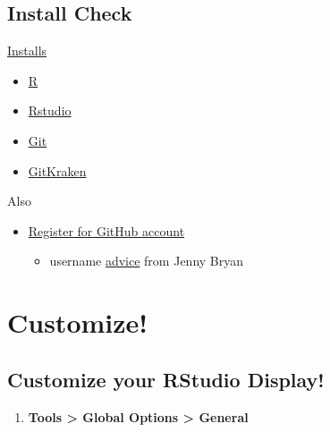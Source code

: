 \documentclass[
  letterpaper,
  DIV=11,
  numbers=noendperiod,
  oneside]{scrartcl}
\providecommand{\tightlist}{%
  \setlength{\itemsep}{0pt}\setlength{\parskip}{0pt}}\usepackage{longtable,booktabs,array}
\begin{document}
\hypertarget{install-check}{%
\subsection{Install Check}\label{install-check}}

\href{installs.qmd}{Installs}

\begin{itemize}
\tightlist
\item
  \href{https://cloud.r-project.org/}{R}
\item
  \href{https://www.rstudio.com/products/rstudio/\#Desktop}{Rstudio}
\item
  \href{https://www.git-scm.com/download}{Git}
\item
  \href{https://www.gitkraken.com/download}{GitKraken}
\end{itemize}

Also

\begin{itemize}
\tightlist
\item
  \href{https://github.com}{Register for GitHub account}

  \begin{itemize}
  \tightlist
  \item
    username \href{https://happygitwithr.com/github-acct.html}{advice}
    from Jenny Bryan
  \end{itemize}
\end{itemize}

\hypertarget{customize}{%
\section{Customize!}\label{customize}}

\hypertarget{customize-your-rstudio-display}{%
\subsection{Customize your RStudio
Display!}\label{customize-your-rstudio-display}}

\begin{enumerate}
\def\labelenumi{\arabic{enumi}.}
\tightlist
\item
  \textbf{Tools \textgreater{} Global Options \textgreater{} General}
\end{enumerate}
\end{document}
